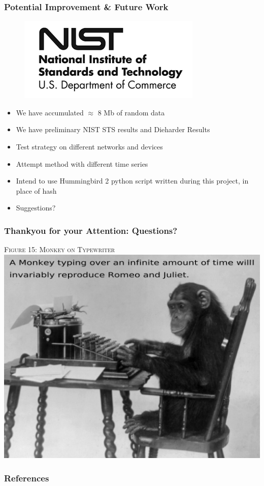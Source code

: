 \documentclass{beamer}
\begin{document}
\begin{frame}
\frametitle{Potential Improvement \& Future Work}

\begin{figure}
\includegraphics[scale=0.5]{images/nist.png}
\end{figure}
\begin{itemize}
	\item We have accumulated $\approx$ 8 Mb of random data
	\item We have preliminary NIST STS results and Dieharder Results
	\item Test strategy on different networks and devices
	\item Attempt method with different time series
	\item Intend to use Hummingbird 2 python script written during this project, in place of hash
	\item Suggestions? 
\end{itemize}
\end{frame}

\begin{frame}
\frametitle{Thankyou for your Attention: Questions?}

\begin{center}
{\tiny \textsc{Figure 15: Monkey on Typewriter}}\\
\includegraphics[scale = 0.35]{images/crj3.jpg}
\end{center}
\end{frame}

\begin{frame}
\frametitle{References}
\end{frame}
\end{document}
